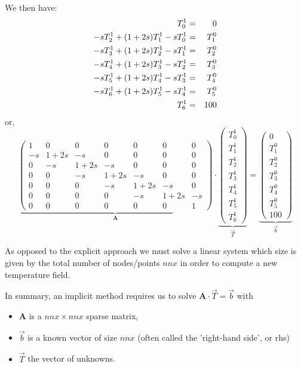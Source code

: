 We then have:
\begin{eqnarray}
T_0^1 &=& 0 \nonumber\\
-s T_{2}^{1} + (1+2s) T_{1}^{1} - s T_{0}^{1} &=& T_1^{0} \nonumber\\
-s T_{3}^{1} + (1+2s) T_{2}^{1} - s T_{1}^{1} &=& T_2^{0} \nonumber\\
-s T_{4}^{1} + (1+2s) T_{3}^{1} - s T_{2}^{1} &=& T_3^{0} \nonumber\\
-s T_{5}^{1} + (1+2s) T_{4}^{1} - s T_{3}^{1} &=& T_4^{0} \nonumber\\
-s T_{6}^{1} + (1+2s) T_{5}^{1} - s T_{4}^{1} &=& T_5^{0} \nonumber\\
T_6^1 &=& 100\nonumber
\end{eqnarray}
or, 
\[
\underbrace{
\left(
\begin{array}{ccccccc}
1 & 0 & 0 & 0 & 0 & 0 & 0  \\
-s & 1+2s & -s & 0 & 0 & 0 & 0 \\
0 & -s & 1+2s & -s & 0 & 0 & 0 \\
0 & 0 & -s & 1+2s & -s & 0 & 0 \\
0 & 0 & 0 & -s & 1+2s & -s & 0 \\
0 & 0 & 0 & 0 & -s & 1+2s & -s \\
0 & 0 & 0 & 0 & 0 & 0 & 1
\end{array}
\right)
}_{\bm A}
\cdot
\underbrace{
\left(
\begin{array}{ccccccc}
T_0^1 \\ T_1^1 \\ T_2^1 \\ T_3^1 \\ T_4^1 \\ T_5^1 \\ T_6^1  
\end{array}
\right)
}_{\vec{T}}
=
\underbrace{
\left(
\begin{array}{ccccccc}
0 \\ T_1^0\\ T_2^0\\ T_3^0\\ T_4^0\\ T_5^0 \\ 100
\end{array}
\right)
}_{\vec{b}}
\]

As opposed to the explicit approach we must solve a linear system which size is given 
by the total number of nodes/points $nnx$ in order to compute a new temperature field.

In summary, an implicit method requires us to solve ${\bm A}\cdot\vec{T} = \vec{b}$ with
\begin{itemize}
\item ${\bm A}$ is a $nnx \times nnx$  {\color{olive}sparse} matrix,
\item ${\vec b}$ is a known vector of size $nnx$ (often called the 'right-hand side', or {\color{olive} rhs})
\item ${\vec T}$ the vector of unknowns.
\end{itemize}



